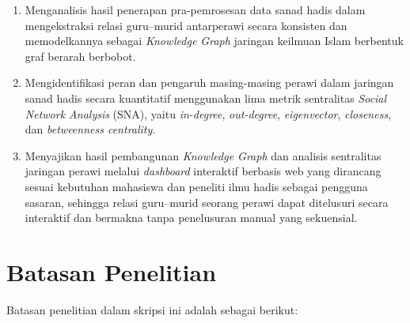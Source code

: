 \begin{enumerate}
	\item Menganalisis hasil penerapan pra-pemrosesan data sanad hadis dalam mengekstraksi relasi guru--murid antarperawi secara konsisten dan memodelkannya sebagai \textit{Knowledge Graph} jaringan keilmuan Islam berbentuk graf berarah berbobot.
	\item Mengidentifikasi peran dan pengaruh masing-masing perawi dalam jaringan sanad hadis secara kuantitatif menggunakan lima metrik sentralitas \textit{Social Network Analysis} (SNA), yaitu \textit{in-degree}, \textit{out-degree}, \textit{eigenvector}, \textit{closeness}, dan \textit{betweenness centrality}.
	\item Menyajikan hasil pembangunan \textit{Knowledge Graph} dan analisis sentralitas jaringan perawi melalui \textit{dashboard} interaktif berbasis web yang dirancang sesuai kebutuhan mahasiswa dan peneliti ilmu hadis sebagai pengguna sasaran, sehingga relasi guru--murid seorang perawi dapat ditelusuri secara interaktif dan bermakna tanpa penelusuran manual yang sekuensial.
\end{enumerate}

\section{Batasan Penelitian}

Batasan penelitian dalam skripsi ini adalah sebagai berikut:

